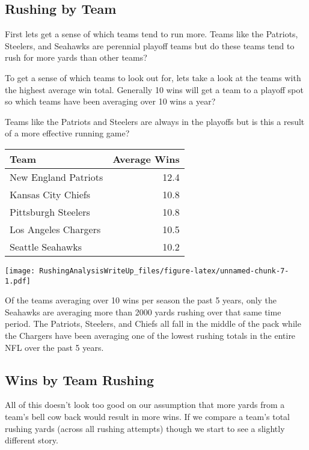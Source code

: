 \documentclass[]{article}
\begin{document}
\hypertarget{rushing-by-team}{%
\subsection{Rushing by Team}\label{rushing-by-team}}

First lets get a sense of which teams tend to run more. Teams like the
Patriots, Steelers, and Seahawks are perennial playoff teams but do
these teams tend to rush for more yards than other teams?

To get a sense of which teams to look out for, lets take a look at the
teams with the highest average win total. Generally 10 wins will get a
team to a playoff spot so which teams have been averaging over 10 wins a
year?

Teams like the Patriots and Steelers are always in the playoffs but is
this a result of a more effective running game?

\begin{table}[H]
\centering
\begin{tabular}{l|r}
\hline
Team & Average Wins\\
\hline
New England Patriots & 12.4\\
\hline
Kansas City Chiefs & 10.8\\
\hline
Pittsburgh Steelers & 10.8\\
\hline
Los Angeles Chargers & 10.5\\
\hline
Seattle Seahawks & 10.2\\
\hline
\end{tabular}
\end{table}

\texttt{[image: RushingAnalysisWriteUp\_files/figure-latex/unnamed-chunk-7-1.pdf]}

Of the teams averaging over 10 wins per season the past 5 years, only
the Seahawks are averaging more than 2000 yards rushing over that same
time period. The Patriots, Steelers, and Chiefs all fall in the middle
of the pack while the Chargers have been averaging one of the lowest
rushing totals in the entire NFL over the past 5 years.

\hypertarget{wins-by-team-rushing}{%
\subsection{Wins by Team Rushing}\label{wins-by-team-rushing}}

All of this doesn't look too good on our assumption that more yards from
a team's bell cow back would result in more wins. If we compare a team's
total rushing yards (across all rushing attempts) though we start to see
a slightly different story.
\end{document}
